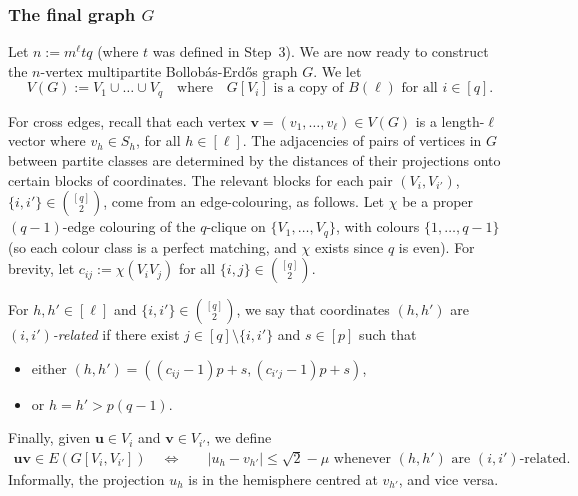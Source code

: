\documentclass[10pt,a4paper]{article}
\newcommand{\V}[1]{\mathbold{#1}}
\theoremstyle{definition}
\begin{document}

\subsubsection{The final graph $G$}\label{sec-mBE}
Let $n:=m^\ell tq$ (where $t$ was defined in Step~3).
We are now ready to construct the $n$-vertex multipartite Bollob\'as-Erd\H{o}s graph $G$.
We let
$$
V(G) := V_1 \cup \ldots \cup V_q\quad\text{where}\quad G[V_i] \text{ is a copy of }B(\ell) \text{ for all }i \in [q].
$$ %

For cross edges, recall that each vertex $\V{v}=(v_1,\ldots, v_\ell)\in V(G)$ is a length-$\ell$ vector where $v_h\in S_h$, for all $h\in [\ell]$. The adjacencies of pairs of vertices in $G$ between partite classes are determined by the distances of their projections onto certain blocks of coordinates. The relevant blocks for each pair $(V_i,V_{i'})$, $\{i,i'\}\in{[q]\choose 2}$, come from an edge-colouring, as follows. 
Let $\chi$ be a proper $(q-1)$-edge colouring of the $q$-clique on $\lbrace V_1,\ldots,V_q\rbrace$, with colours $\lbrace 1,\ldots,q-1\rbrace$ (so each colour class is a perfect matching, and $\chi$ exists since $q$ is even).
For brevity, let $c_{ij} := \chi(V_iV_j)$ for all $\{i,j\}\in{[q]\choose 2}$.

For $h,h'\in[\ell]$ and $\{i,i'\}\in{[q]\choose 2}$, we say that coordinates $(h,h')$ are \emph{$(i,i')$-related} if there exist $j \in [q]\setminus\lbrace i,i'\rbrace$ and $s \in [p]$ such that 
\begin{itemize}
	\item either $(h,h')=((c_{ij}-1)p+s,(c_{i'j}-1)p+s)$,
	
	\item  or $h = h' > p(q-1)$.
\end{itemize}

Finally, given $\V{u}  \in V_i$ and $\V{v}  \in V_{i'}$, we define
\begin{align*}
\V{u}\V{v} \in E(G[V_i,V_{i'}]) \quad \iff \quad &|u_{h}-v_{h'}| \leq \sqrt{2}-\mu \text{ whenever }(h,h') \text{ are } (i,i')\text{-related}.
\end{align*}
Informally, the projection $u_h$ is in the hemisphere centred at $v_{h'}$, and vice versa.
\end{document}
